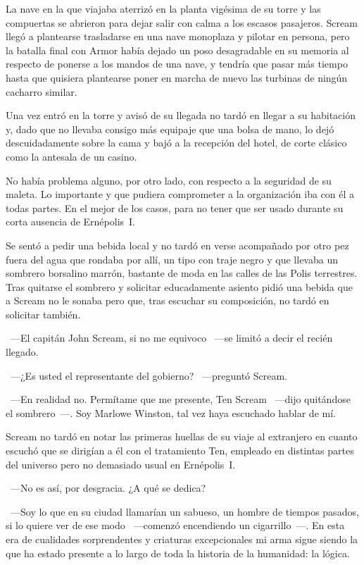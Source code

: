 La nave en la que viajaba aterrizó en la planta vigésima de su torre y las compuertas se abrieron para dejar salir con calma a los escasos pasajeros. Scream llegó a plantearse trasladarse en una nave monoplaza y pilotar en persona, pero la batalla final con Armor había dejado un poso desagradable en su memoria al respecto de ponerse a los mandos de una nave, y tendría que pasar más tiempo hasta que quisiera plantearse poner en marcha de nuevo las turbinas de ningún cacharro similar.

Una vez entró en la torre y avisó de su llegada no tardó en llegar a su habitación y, dado que no llevaba consigo más equipaje que una bolsa de mano, lo dejó descuidadamente sobre la cama y bajó a la recepción del hotel, de corte clásico como la antesala de un casino.

No había problema alguno, por otro lado, con respecto a la seguridad de su maleta. Lo importante y que pudiera comprometer a la organización iba con él a todas partes. En el mejor de los casos, para no tener que ser usado durante su corta ausencia de Ernépolis~I.

Se sentó a pedir una bebida local y no tardó en verse acompañado por otro pez fuera del agua que rondaba por allí, un tipo con traje negro y que llevaba un sombrero borsalino marrón, bastante de moda en las calles de las Polis terrestres. Tras quitarse el sombrero y solicitar educadamente asiento pidió una bebida que a Scream no le sonaba pero que, tras escuchar su composición, no tardó en solicitar también.

~---El capitán John Scream, si no me equivoco ~---se limitó a decir el recién llegado.

~---¿Es usted el representante del gobierno? ~---preguntó Scream.

~---En realidad no. Permítame que me presente, Ten Scream ~---dijo quitándose el sombrero~---. Soy Marlowe Winston, tal vez haya escuchado hablar de mí.

Scream no tardó en notar las primeras huellas de su viaje al extranjero en cuanto escuchó que se dirigían a él con el tratamiento Ten, empleado en distintas partes del universo pero no demasiado usual en Ernépolis~I.

~---No es así, por desgracia. ¿A qué se dedica?

~---Soy lo que en su ciudad llamarían un sabueso, un hombre de tiempos pasados, si lo quiere ver de ese modo ~---comenzó encendiendo un cigarrillo~---. En esta era de cualidades sorprendentes y criaturas excepcionales mi arma sigue siendo la que ha estado presente a lo largo de toda la historia de la humanidad: la lógica.

